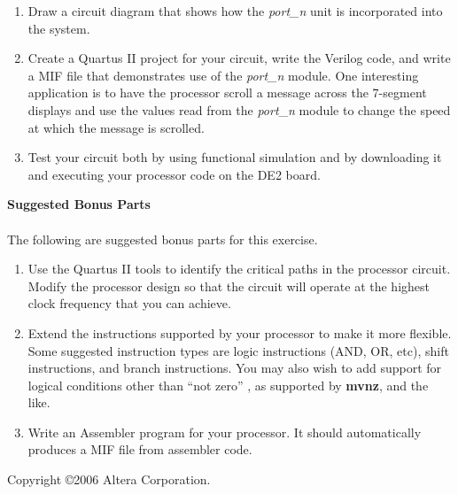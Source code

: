 \documentclass[epsfig,10pt,fullpage]{article}
\begin{document}
\begin{enumerate}
\item Draw a circuit diagram that shows how the {\it port\_n} unit is incorporated into the system.
\item Create a Quartus II project for your circuit, write the Verilog code, and write a MIF
file that demonstrates use of the {\it port\_n} module.
One interesting application is to have the processor scroll a message across 
the 7-segment displays and use
the values read from the {\it port}\_{\it n} module to change the speed at which the message
is scrolled.
\item Test your circuit both by using functional simulation and by downloading it and executing
your processor code on the DE2 board.
\end{enumerate}
\noindent
{\bf Suggested Bonus Parts}
~\\
~\\
\noindent
The following are suggested bonus parts for this exercise.
\begin{enumerate}
\item Use the Quartus II tools to identify the critical paths in the processor circuit.
Modify the processor design so that the circuit will operate at the highest clock
frequency that you can achieve.
\item Extend the instructions supported by your processor to make it more flexible. Some suggested
instruction types are logic instructions (AND, OR, etc), shift instructions, and branch
instructions. You may also wish to add support for logical conditions other than ``not zero''
, as supported by {\bf mvnz}, and the like.
\item Write an Assembler program for your processor. It should automatically produces a MIF file
from assembler code.
\end{enumerate}

Copyright \copyright 2006 Altera Corporation.
\end{document}
